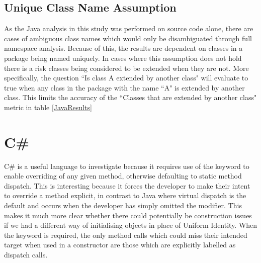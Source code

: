 \subsection{Unique Class Name Assumption}
\label{uniqueNames}
As the Java analysis in this study was performed on source code alone, there are cases of ambiguous class names which would only be disambiguated through full namespace analysis. Because of this, the results are dependent on classes in a package being named uniquely. In cases where this assumption does not hold there is a risk classes being considered to be extended when they are not. More specifically, the question ``Is class A extended by another class" will evaluate to true when any class in the package with the name ``A" is extended by another class. This limits the accuracy of the ``Classes that are extended by another class" metric in table \ref{JavaResults}

\section{C\#}
C\# is a useful language to investigate because it requires use of the  keyword to enable overriding of any given method, otherwise defaulting to static method dispatch. This is interesting because it forces the developer to make their intent to override a method explicit, in contrast to Java where virtual dispatch is the default and occurs when the developer has simply omitted the  modifier. This makes it much more clear whether there could potentially be construction issues if we had a different way of initialising objects in place of Uniform Identity. When the  keyword is required, the only method calls which could miss their intended target when used in a constructor are those which are explicitly labelled as  dispatch calls.

